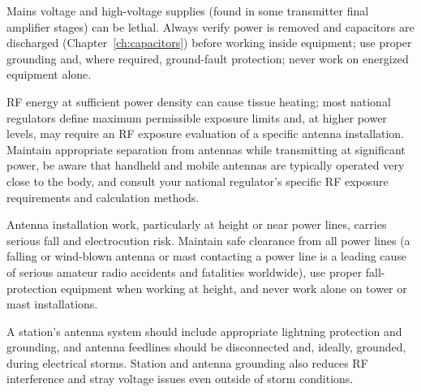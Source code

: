 \begin{safetynote}
Mains voltage and high-voltage supplies (found in some transmitter
final amplifier stages) can be lethal. Always verify power is removed
and capacitors are discharged (Chapter~\ref{ch:capacitors}) before
working inside equipment; use proper grounding and, where required,
ground-fault protection; never work on energized equipment alone.
\end{safetynote}

\begin{safetynote}[RF exposure]
RF energy at sufficient power density can cause tissue heating; most
national regulators define maximum permissible exposure limits and, at
higher power levels, may require an RF exposure evaluation of a
specific antenna installation. Maintain appropriate separation from
antennas while transmitting at significant power, be aware that
handheld and mobile antennas are typically operated very close to the
body, and consult your national regulator's specific RF exposure
requirements and calculation methods.
\end{safetynote}

\begin{safetynote}
Antenna installation work, particularly at height or near power lines,
carries serious fall and electrocution risk. Maintain safe clearance
from all power lines (a falling or wind-blown antenna or mast contacting
a power line is a leading cause of serious amateur radio accidents and
fatalities worldwide), use proper fall-protection equipment when
working at height, and never work alone on tower or mast installations.
\end{safetynote}

\begin{safetynote}
A station's antenna system should include appropriate lightning
protection and grounding, and antenna feedlines should be disconnected
and, ideally, grounded, during electrical storms. Station and antenna
grounding also reduces RF interference and stray voltage issues even
outside of storm conditions.
\end{safetynote}

